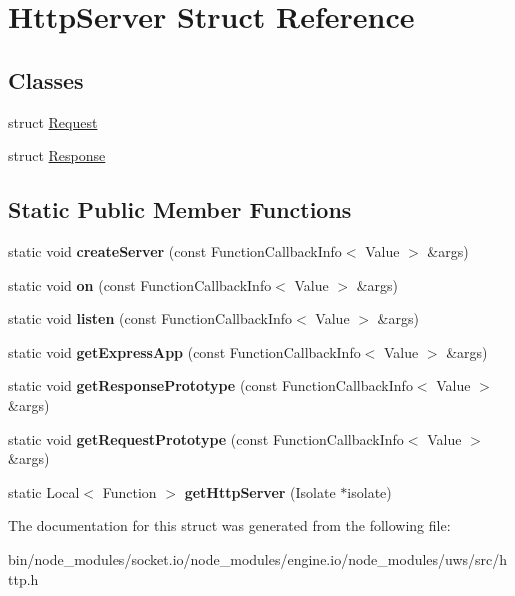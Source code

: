 \hypertarget{struct_http_server}{}\section{Http\+Server Struct Reference}
\label{struct_http_server}
\subsection*{Classes}
\begin{DoxyCompactItemize}
\item 
struct \mbox{\hyperlink{struct_http_server_1_1_request}{Request}}
\item 
struct \mbox{\hyperlink{struct_http_server_1_1_response}{Response}}
\end{DoxyCompactItemize}
\subsection*{Static Public Member Functions}
\begin{DoxyCompactItemize}
\item 
\mbox{\label{struct_http_server_a927f9c92f3ff03982575dfb1c281b30c}} 
static void {\bfseries create\+Server} (const Function\+Callback\+Info$<$ Value $>$ \&args)
\item 
\mbox{\label{struct_http_server_aeab7995eed7de4412c7079ad988a0cb7}} 
static void {\bfseries on} (const Function\+Callback\+Info$<$ Value $>$ \&args)
\item 
\mbox{\label{struct_http_server_a5ee2e1be1ebb6b5d3fef21cf1f42e8f1}} 
static void {\bfseries listen} (const Function\+Callback\+Info$<$ Value $>$ \&args)
\item 
\mbox{\label{struct_http_server_acb4c7029df7d3e76f8e551a27d8a8e24}} 
static void {\bfseries get\+Express\+App} (const Function\+Callback\+Info$<$ Value $>$ \&args)
\item 
\mbox{\label{struct_http_server_ac9f11f5841cad53f324ca58e089f8f5b}} 
static void {\bfseries get\+Response\+Prototype} (const Function\+Callback\+Info$<$ Value $>$ \&args)
\item 
\mbox{\label{struct_http_server_aa091caac82ac38806afac37437078e1d}} 
static void {\bfseries get\+Request\+Prototype} (const Function\+Callback\+Info$<$ Value $>$ \&args)
\item 
\mbox{\label{struct_http_server_ac64ae15a916ca8342b2dd50e5a6f8fac}} 
static Local$<$ Function $>$ {\bfseries get\+Http\+Server} (Isolate $\ast$isolate)
\end{DoxyCompactItemize}


The documentation for this struct was generated from the following file\+:\begin{DoxyCompactItemize}
\item 
bin/node\+\_\+modules/socket.\+io/node\+\_\+modules/engine.\+io/node\+\_\+modules/uws/src/http.\+h\end{DoxyCompactItemize}
